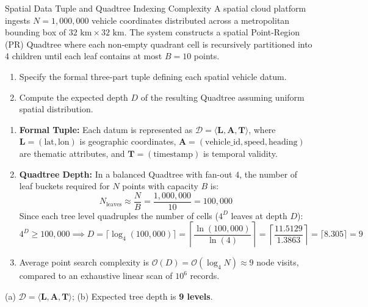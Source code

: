\begin{solved}{Spatial Data Tuple and Quadtree Indexing Complexity}
\Given A spatial cloud platform ingests $N = 1,000,000$ vehicle coordinates distributed across a metropolitan bounding box of $32\text{ km} \times 32\text{ km}$. The system constructs a spatial Point-Region (PR) Quadtree where each non-empty quadrant cell is recursively partitioned into 4 children until each leaf contains at most $B = 10$ points.
\begin{enumerate}[label=(\alph*),leftmargin=*]
  \item Specify the formal three-part tuple defining each spatial vehicle datum.
  \item Compute the expected depth $D$ of the resulting Quadtree assuming uniform spatial distribution.
\end{enumerate}
\Steps
\begin{enumerate}[leftmargin=*]
  \item \textbf{Formal Tuple:} Each datum is represented as $\mathcal{D} = \langle \mathbf{L}, \mathbf{A}, \mathbf{T} \rangle$, where $\mathbf{L} = (\text{lat}, \text{lon})$ is geographic coordinates, $\mathbf{A} = (\text{vehicle\_id}, \text{speed}, \text{heading})$ are thematic attributes, and $\mathbf{T} = (\text{timestamp})$ is temporal validity.
  \item \textbf{Quadtree Depth:}
  In a balanced Quadtree with fan-out $4$, the number of leaf buckets required for $N$ points with capacity $B$ is:
  \begin{equation}
  N_{\text{leaves}} \approx \frac{N}{B} = \frac{1,000,000}{10} = 100,000
  \end{equation}
  Since each tree level quadruples the number of cells ($4^D$ leaves at depth $D$):
  \begin{equation}
  4^D \ge 100,000 \implies D = \lceil \log_4(100,000) \rceil = \left\lceil \frac{\ln(100,000)}{\ln(4)} \right\rceil = \left\lceil \frac{11.5129}{1.3863} \right\rceil = \lceil 8.305 \rceil = 9
  \end{equation}
  \item Average point search complexity is $\mathcal{O}(D) = \mathcal{O}(\log_4 N) \approx 9$ node visits, compared to an exhaustive linear scan of $10^6$ records.
\end{enumerate}
\Answer (a) $\mathbf{\mathcal{D} = \langle L, A, T \rangle}$; (b) Expected tree depth is \textbf{9 levels}.
\end{solved}

